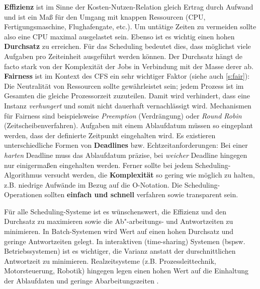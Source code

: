 \textbf{Effizienz} ist im Sinne der Kosten-Nutzen-Relation gleich Ertrag durch Aufwand und ist ein Maß für den Umgang mit knappen Ressourcen (CPU, Fertigungsmaschine, Flughafengate, etc.). Um untätige Zeiten zu vermeiden sollte also eine CPU maximal ausgelastet sein. Ebenso ist es wichtig einen hohen \textbf{Durchsatz} zu erreichen. Für das Scheduling bedeutet dies, dass möglichst viele Aufgaben pro Zeiteinheit ausgeführt werden können. Der Durchsatz hängt de facto stark von der Komplexität der Jobs in Verbindung mit der Masse derer ab. \textbf{Fairness} ist im Kontext des CFS ein sehr wichtiger Faktor (siehe auch \ref{s:fair}): Die Neutralität von Ressourcen sollte gewährleistet sein; jedem Prozess ist im Gesamten die gleiche Prozessorzeit zuzuteilen. Damit wird verhindert, dass eine Instanz \textit{verhungert} und somit nicht dauerhaft vernachlässigt wird. Mechanismen für Fairness sind beispielsweise \textit{Preemption} (Verdrängung) o\-der \textit{Round Robin} (Zeitscheibenverfahren). 
Aufgaben mit einem Ablaufdatum müssen so eingeplant werden, dass der definierte Zeitpunkt eingehalten wird. Es existieren unterschiedliche Formen von \textbf{Deadlines} bzw. Echtzeitanforderungen: Bei einer \textit{harten} Deadline muss das Ablaufdatum präzise, bei \textit{weicher} Deadline hingegen nur einigermaßen eingehalten werden. Ferner sollte bei jedem Sche\-duling-Algorithmus versucht werden, die \textbf{Komplexität} so gering wie möglich zu halten, z.B. niedrige Aufwände im Bezug auf die O-Notation. Die Scheduling-Operationen sollten \textbf{einfach und schnell} verfahren sowie transparent sein.  

Für alle Scheduling-Systeme ist es wünschenswert, die Effizienz und den Durchsatz zu maximieren sowie  die Ab"-arbeitungs- und Antwortzeiten zu minimieren. In Batch-Systemen wird Wert auf einen hohen Durchsatz und geringe Antwortzeiten gelegt. In interaktiven (time-sharing) Systemen (bspsw. Betriebssystemen) ist es wichtiger, die Varianz anstatt der durschnittlichen Antwortzeit zu minimieren. Realzeitsysteme (z.B. Prozessleit\-technik, Motorsteuerung, Robotik) hingegen legen einen hohen Wert auf die Einhaltung der Ablaufdaten und geringe Abarbeitungszeiten \cite{asilberschatz}.\\


